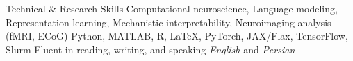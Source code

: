 
\begin{rubric}{Technical \& Research Skills}
	Computational neuroscience, Language modeling, Representation learning, Mechanistic interpretability, Neuroimaging analysis (fMRI, ECoG)
	Python, MATLAB, R, \LaTeX, PyTorch, JAX/Flax, TensorFlow, Slurm
\entry*[Languages]
	Fluent in reading, writing, and speaking \emph{English} and \emph{Persian}
\end{rubric}